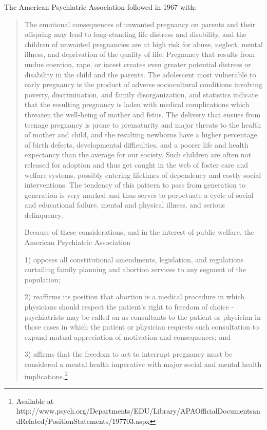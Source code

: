 \begin{refsection}
The American Psychiatric Association followed in 1967 with:

\begin{quote}

The emotional consequences of unwanted pregnancy on parents and their offspring may lead to long-standing life distress and disability, and the children of unwanted pregnancies are at high risk for abuse, neglect, mental illness, and deprivation of the quality of life. Pregnancy that results from undue coercion, rape, or incest creates even greater potential distress or disability in the child and the parents. The adolescent most vulnerable to early pregnancy is the product of adverse sociocultural conditions involving poverty, discrimination, and family disorganization, and statistics indicate that the resulting pregnancy is laden with medical complications which threaten the well-being of mother and fetus. The delivery that ensues from teenage pregnancy is prone to prematurity and major threats to the health of mother and child, and the resulting newborns have a higher percentage of birth defects, developmental difficulties, and a poorer life and health expectancy than the average for our society. Such children are often not released for adoption and thus get caught in the web of foster care and welfare systems, possibly entering lifetimes of dependency and costly social interventions. The tendency of this pattern to pass from generation to generation is very marked and thus serves to perpetuate a cycle of social and educational failure, mental and physical illness, and serious delinquency.

Because of these considerations, and in the interest of public welfare, the American Psychiatric Association

1) opposes all constitutional amendments, legislation, and regulations curtailing family planning and abortion services to any segment of the population; 

2) reaffirms its position that abortion is a medical procedure in which physicians should respect the patient's right to freedom of choice - psychiatrists may be called on as consultants to the patient or physician in those cases in which the patient or physician requests such consultation to expand mutual appreciation of motivation and consequences; and 

3) affirms that the freedom to act to interrupt pregnancy must be considered a mental health imperative with major social and mental health implications.\footnote{Available at http:\slash \slash www.psych.org\slash Departments\slash EDU\slash Library\slash APAOfficialDocumentsandRelated\slash PositionStatements\slash 197703.aspx} ~\citep{Anonymous:1967hr}
\end{quote}


\end{refsection}
